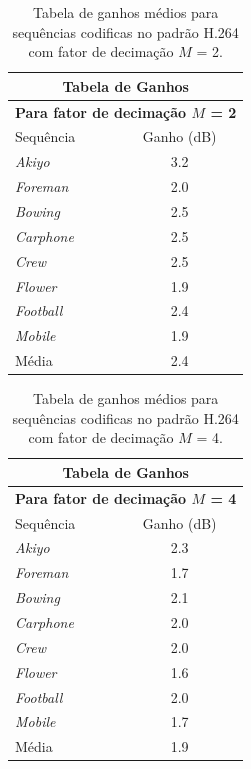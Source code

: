 \begin{table}[hbt]
\centering
\caption{Tabela de ganhos médios para sequências codificas no padrão H.264 com fator de decimação $M$ = 2.}

\label{GanhoH2642}
\begin{tabular}{|l|c|}
\hline
\multicolumn{2}{|c|}{\textbf{Tabela de Ganhos}}\\
\hline
\hline
\multicolumn{2}{|c|}{\textbf{Para fator de decimação $M$ = 2}}\\
\hline
\hline			
Sequência	    & Ganho (dB)\\
\hline
\hline
\textit{Akiyo}		&3.2\\
\hline
\textit{Foreman}		&2.0\\
\hline
\textit{Bowing}		&2.5\\
\hline
\textit{Carphone}	&2.5\\
\hline
\textit{Crew}		&2.5\\
\hline
\textit{Flower}		&1.9\\
\hline
\textit{Football}	&2.4\\
\hline
\textit{Mobile}	&1.9\\
\hline
\hline
Média		&2.4\\
\hline
\end{tabular}

\end{table}

\begin{table}[hbt]
\centering
\caption{Tabela de ganhos médios para sequências codificas no padrão H.264 com fator de decimação $M$ = 4.}	
\label{GanhoH2644}
\begin{tabular}{|l|c|}
\hline
\multicolumn{2}{|c|}{\textbf{Tabela de Ganhos}}\\
\hline
\hline
\multicolumn{2}{|c|}{\textbf{Para fator de decimação $M$ = 4}}\\
\hline
\hline			
Sequência	    & Ganho (dB)\\
\hline
\hline
\textit{Akiyo}		&2.3\\
\hline
\textit{Foreman}		&1.7 \\
\hline
\textit{Bowing}		&2.1\\
\hline
\textit{Carphone}	& 2.0\\
\hline
\textit{Crew}		& 2.0\\
\hline
\textit{Flower}		&1.6\\
\hline
\textit{Football}	&2.0\\
\hline
\textit{Mobile}	&1.7\\
\hline
\hline
Média	&1.9\\
\hline
\end{tabular}
\end{table}

